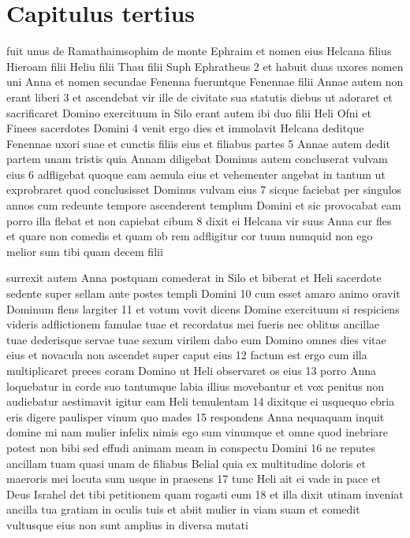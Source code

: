 \section{Capitulus tertius}

\beginnumbering

 fuit  unus de Ramathaimsophim de monte Ephraim et nomen eius Helcana filius Hieroam filii Heliu filii Thau filii Suph Ephratheus  2 et habuit duas uxores nomen uni Anna et nomen secundae Fenenna fueruntque Fenennae filii Annae autem non erant liberi  3 et ascendebat vir ille de civitate sua statutis diebus ut adoraret et sacrificaret Domino exercituum in Silo erant autem ibi duo filii Heli Ofni et Finees sacerdotes Domini  4 venit ergo dies et immolavit Helcana deditque Fenennae uxori suae et cunctis filiis eius et filiabus partes  5 Annae autem dedit partem unam tristis quia Annam diligebat Dominus autem concluserat vulvam eius  6 adfligebat quoque eam aemula eius et vehementer angebat in tantum ut exprobraret quod conclusisset Dominus vulvam eius  7 sicque faciebat per singulos annos cum redeunte tempore ascenderent templum Domini et sic provocabat eam porro illa flebat et non capiebat cibum  8 dixit  ei Helcana vir suus Anna cur fles et quare non comedis et quam ob rem adfligitur cor tuum numquid non ego melior sum tibi quam decem filii\pend

 surrexit autem Anna postquam comederat in Silo et biberat et Heli sacerdote sedente super sellam ante postes templi Domini  10 cum esset amaro animo oravit Dominum flens largiter  11 et votum vovit dicens Domine exercituum si respiciens videris adflictionem famulae tuae et recordatus mei fueris nec oblitus ancillae tuae dederisque servae tuae sexum virilem dabo eum Domino omnes dies vitae eius et novacula non ascendet super caput eius  12 factum est ergo cum illa multiplicaret preces coram Domino ut Heli observaret os eius  13 porro Anna loquebatur in corde suo tantumque labia illius movebantur et vox penitus non audiebatur aestimavit igitur eam Heli temulentam  14 dixitque ei usquequo ebria eris digere paulisper vinum quo mades  15 respondens Anna nequaquam inquit domine mi nam mulier infelix nimis ego sum vinumque et omne quod inebriare potest non bibi sed effudi animam meam in conspectu Domini  16 ne reputes ancillam tuam quasi unam de filiabus Belial quia ex multitudine doloris et maeroris mei locuta sum usque in praesens  17 tunc Heli ait ei vade in pace et Deus Israhel det tibi petitionem quam rogasti eum  18 et illa dixit utinam inveniat ancilla tua gratiam in oculis tuis et abiit mulier in viam suam et comedit vultusque eius non sunt amplius in diversa mutati\pend

